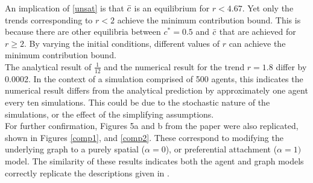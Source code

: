 An implication of \eqref{unsat} is that $\Bar{c}$ is an equilibrium for $r<4.67$. Yet only the trends corresponding to $r<2$ achieve the minimum contribution bound. This is because there are other equilibria between $c^*=0.5$ and $\Bar{c}$ that are achieved for $r\geq2$. By varying the initial conditions, different values of $r$ can achieve the minimum contribution bound. \\

 The analytical result of $\tfrac{1}{12}$ and the numerical result for the trend $r=1.8$ differ by 0.0002. In the context of a simulation comprised of 500 agents, this indicates the numerical result differs from the analytical prediction by approximately one agent every ten simulations. This could be due to the stochastic nature of the simulations, or the effect of the simplifying assumptions. \\



For further confirmation, Figures 5a and b from the paper were also replicated, shown in Figures \ref{comp1}, and \ref{comp2}. These correspond to modifying the underlying graph to a purely spatial ($\alpha = 0$), or preferential attachment ($\alpha = 1)$ model. The similarity of these results indicates both the agent and graph models correctly replicate the descriptions given in \cite{RN49}.

